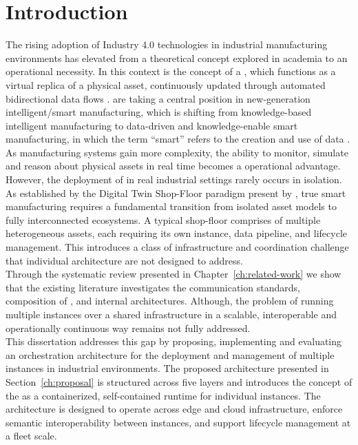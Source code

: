 
\chapter{Introduction}
\label{ch:introduction}
The rising adoption of Industry 4.0 technologies in industrial manufacturing environments has elevated \DTs 
from a theoretical concept explored in academia to an operational necessity. In this context is the concept of a \DT, 
which functions as a virtual replica of a physical asset, continuously updated through automated bidirectional data 
flows \cite{Fuller2020, Kritzinger2018}. \DTs are taking a central position in new-generation intelligent/smart manufacturing, 
which is shifting from knowledge-based intelligent manufacturing to data-driven and knowledge-enable smart manufacturing, in 
which the term ``smart'' refers to the creation and use of data \cite{Tao2019b}. As manufacturing systems gain more complexity, 
the ability to monitor, simulate and reason about physical assets in real time becomes a operational advantage. However, the 
deployment of \DTs in real industrial settings rarely occurs in isolation. As established by the Digital Twin Shop-Floor paradigm 
present by , true smart manufacturing requires a fundamental transition from isolated asset models to 
fully interconnected ecosystems. A typical shop-floor comprises of multiple heterogeneous assets, each requiring its own \DT 
instance, data pipeline, and lifecycle management. This introduces a class of infrastructure and coordination challenge that 
individual \DT architecture are not designed to address.\\
Through the systematic review presented in Chapter~\ref{ch:related-work} we show that the existing literature investigates the communication standards, 
composition of \DTs, and internal architectures. Although, the problem of running multiple \DTs instances over a shared infrastructure 
in a scalable, interoperable and operationally continuous way remains not fully addressed.\\
This dissertation addresses this gap by proposing, implementing and evaluating an orchestration architecture for the deployment 
and management of multiple \DT instances in industrial environments. The proposed architecture presented in Section~\ref{ch:proposal} is structured 
across five layers and introduces the concept of the \DTPod as a containerized, self-contained runtime for individual \DT instances. 
The architecture is designed to operate across edge and cloud infrastructure, enforce semantic interoperability between \DT 
instances, and support lifecycle management at a fleet scale.

